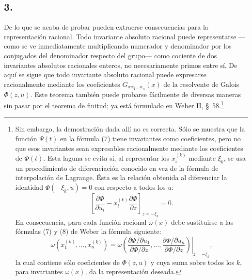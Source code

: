 \documentclass[11pt]{article}
\begin{document}
\subsection*{3.}
De lo que se acaba de probar pueden extraerse consecuencias para la representación racional. Todo invariante absoluto racional puede representarse ---como se ve inmediatamente multiplicando numerador y denominador por los conjugados del denominador respecto del grupo--- como cociente de dos invariantes absolutos racionales enteros, no necesariamente primos entre sí. De aquí se sigue que todo invariante absoluto racional puede expresarse racionalmente mediante los coeficientes $G_{\alpha\alpha_1\ldots\alpha_n}(x)$ de la resolvente de Galois $\Phi(z,u)$. Este teorema también puede probarse fácilmente de diversas maneras sin pasar por el teorema de finitud; ya está formulado en Weber II, \S\ 58.\footnote{Sin embargo, la demostración dada allí no es correcta. Sólo se muestra que la función $\Psi(t)$ en la fórmula (7) tiene invariantes como coeficientes, pero no que esos invariantes sean expresables racionalmente mediante los coeficientes de $\Phi(t)$. Esta laguna se evita si, al representar los $x_i^{(k)}$ mediante $\xi_k$, se usa un procedimiento de diferenciación conocido en vez de la fórmula de interpolación de Lagrange. Ésta es la relación obtenida al diferenciar la identidad $\Phi(-\xi_k,u)=0$ con respecto a todos los $u$:
\[
 \left[\frac{\partial\Phi}{\partial u_i}
      -x_i^{(k)}\frac{\partial\Phi}{\partial z}\right]_{z=-\xi_k}=0.
\]
En consecuencia, para cada función racional $\omega(x)$ debe sustituirse a las fórmulas (7) y (8) de Weber la fórmula siguiente:
\[
 \omega(x_1^{(k)},\ldots,x_n^{(k)})=
 \left.
 \omega\!\left(
   \frac{\partial\Phi/\partial u_1}{\partial\Phi/\partial z},\ldots,
   \frac{\partial\Phi/\partial u_n}{\partial\Phi/\partial z}
 \right)\right|_{z=-\xi_k},
\]
la cual contiene sólo coeficientes de $\Phi(z,u)$ y cuya suma sobre todos los $k$, para invariantes $\omega(x)$, da la representación deseada.}
\end{document}
